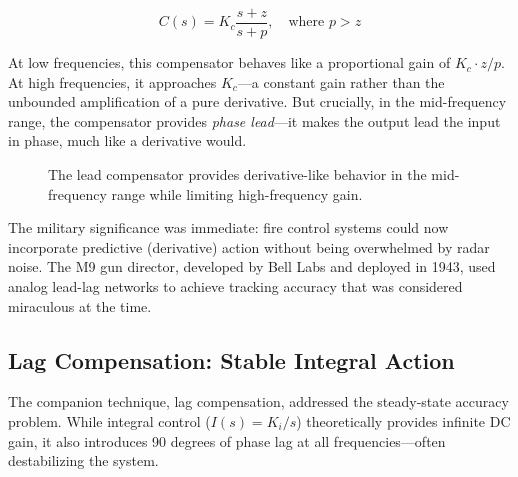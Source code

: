 \begin{equation}
C(s) = K_c \frac{s + z}{s + p}, \quad \text{where } p > z
\label{eq:lead_compensator_intro}
\end{equation}

At low frequencies, this compensator behaves like a proportional gain of $K_c \cdot z/p$. At high frequencies, it approaches $K_c$---a constant gain rather than the unbounded amplification of a pure derivative. But crucially, in the mid-frequency range, the compensator provides \textit{phase lead}---it makes the output lead the input in phase, much like a derivative would.

\begin{figure}[htbp]
\centering
{}
\caption{The lead compensator provides derivative-like behavior in the mid-frequency range while limiting high-frequency gain.}
\label{fig:lead_vs_derivative}
\end{figure}

The military significance was immediate: fire control systems could now incorporate predictive (derivative) action without being overwhelmed by radar noise. The M9 gun director, developed by Bell Labs and deployed in 1943, used analog lead-lag networks to achieve tracking accuracy that was considered miraculous at the time.

\subsection{Lag Compensation: Stable Integral Action}

The companion technique, lag compensation, addressed the steady-state accuracy problem. While integral control ($I(s) = K_i/s$) theoretically provides infinite DC gain, it also introduces 90 degrees of phase lag at all frequencies---often destabilizing the system.

